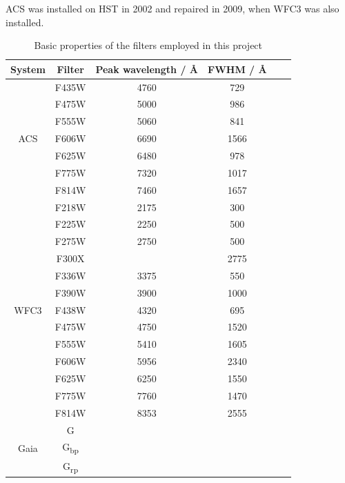 \documentclass[12pt, a4paper]{report}
\begin{document}
ACS was installed on HST in 2002 and repaired in 2009, when WFC3 was also installed.

\begin{table}
\begin{center}
\begin{tabular}{cccccc}
\hline
System & Filter & Peak wavelength / \AA & FWHM / \AA \\
\hline

& F435W & 4760 & 729 \\
& F475W & 5000 & 986 \\
& F555W & 5060 & 841 \\
ACS & F606W & 6690 & 1566 \\
& F625W & 6480 & 978 \\
& F775W & 7320 & 1017 \\
& F814W & 7460 & 1657 \\
\hline
& F218W & 2175 & 300 \\
& F225W & 2250 & 500 \\
& F275W & 2750 & 500 \\
& F300X &  & 2775 \\
& F336W & 3375 & 550 \\
& F390W & 3900 & 1000 \\
WFC3 & F438W & 4320 & 695 \\
& F475W & 4750 & 1520 \\
& F555W & 5410 & 1605 \\
& F606W & 5956 & 2340 \\
& F625W & 6250 & 1550 \\
& F775W & 7760 & 1470 \\
& F814W & 8353 & 2555 \\
\hline
& G &  &  \\
Gaia & G\textsubscript{bp} &  &  \\
& G\textsubscript{rp} &  &  \\
\hline

\end{tabular}
\caption{Basic properties of the filters employed in this project}
\label{filter_basics}
\end{center}
\end{table}
\end{document}
